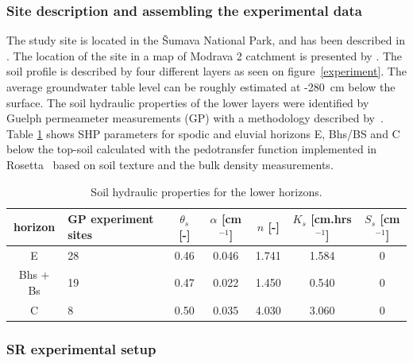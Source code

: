 \documentclass[review,times,3p,10pt]{elsarticle}
\newcommand{\fs}{\footnotesize}
\begin{document}
\subsubsection{Site description and assembling the experimental data}%
\label{site}
The study site is located in the \v{S}umava National Park, and has been described in \citep{Jacka1}. The location of the site in a map of Modrava 2 catchment is presented by \cite{Jacka2}.
The soil profile is described by four different layers as seen on figure~\ref{experiment}. The average groundwater table level can be roughly estimated at -280~cm below the surface.
The soil hydraulic properties of the lower layers were identified by Guelph permeameter measurements (GP) with a methodology described by~\cite{Jacka1}. 
Table \ref{tab_SHP} shows SHP parameters for spodic and eluvial horizons E, Bhs/BS and C below the top-soil calculated with the pedotransfer function implemented in Rosetta~\citep{Schaap} based on soil texture and the bulk density measurements.







 




\begin{table}[ht]
\begin{center}
\caption{Soil hydraulic properties for the lower horizons.}
\fs
\begin{tabular}{c | p{2cm} | c c c c c}
\toprule
horizon &  GP experiment sites  & $\theta_s$ [-] & $\alpha$ [cm$^{-1}$]& $n$ [-]& $K_s$ [cm.hrs$^{-1}$] & $S_s$ [cm$^{-1}$] \\ \hline
E & 28 &  0.46 & 0.046 & 1.741 & 1.584 & 0\\
Bhs + Bs & 19  &0.47&  0.022 & 1.450 & 0.540 & 0\\
C & 8 & 0.50 & 0.035 & 4.030 &  3.060 & 0 \\
\toprule
\end{tabular}
\label{tab_SHP}
\end{center}
\end{table}


\subsubsection{SR experimental setup}
\label{krivka}
\end{document}

